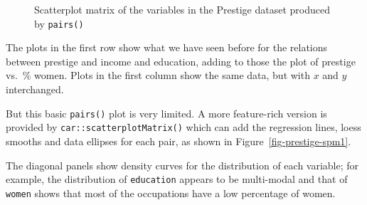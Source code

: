 \documentclass[
  letterpaper,
  10pt,
  krantz2]{krantz}
\begin{document}
\begin{figure}[H]


\caption{\label{fig-prestige-pairs}Scatterplot matrix of the variables
in the Prestige dataset produced by \texttt{pairs()}}

\end{figure}%

The plots in the first row show what we have seen before for the
relations between prestige and income and education, adding to those the
plot of prestige vs.~\% women. Plots in the first column show the same
data, but with \(x\) and \(y\) interchanged.

But this basic \texttt{pairs()} plot is very limited. A more
feature-rich version is provided by \texttt{car::scatterplotMatrix()}
which can add the regression lines, loess smooths and data ellipses for
each pair, as shown in Figure~\ref{fig-prestige-spm1}.

The diagonal panels show density curves for the distribution of each
variable; for example, the distribution of \texttt{education} appears to
be multi-modal and that of \texttt{women} shows that most of the
occupations have a low percentage of women.
\end{document}

